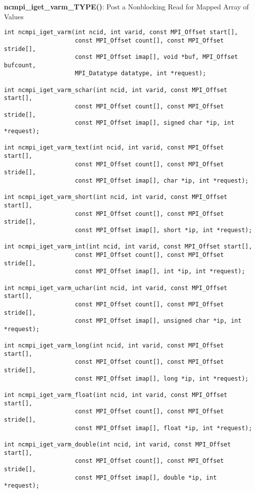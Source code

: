 {\bf ncmpi\_iget\_varm\_TYPE()}: Post a Nonblocking Read for Mapped Array of Values

\begin{verbatim}
int ncmpi_iget_varm(int ncid, int varid, const MPI_Offset start[],
                    const MPI_Offset count[], const MPI_Offset stride[],
                    const MPI_Offset imap[], void *buf, MPI_Offset bufcount,
                    MPI_Datatype datatype, int *request); 

int ncmpi_iget_varm_schar(int ncid, int varid, const MPI_Offset start[],
                    const MPI_Offset count[], const MPI_Offset stride[],
                    const MPI_Offset imap[], signed char *ip, int *request); 

int ncmpi_iget_varm_text(int ncid, int varid, const MPI_Offset start[],
                    const MPI_Offset count[], const MPI_Offset stride[],
                    const MPI_Offset imap[], char *ip, int *request); 

int ncmpi_iget_varm_short(int ncid, int varid, const MPI_Offset start[],
                    const MPI_Offset count[], const MPI_Offset stride[],
                    const MPI_Offset imap[], short *ip, int *request); 

int ncmpi_iget_varm_int(int ncid, int varid, const MPI_Offset start[],
                    const MPI_Offset count[], const MPI_Offset stride[],
                    const MPI_Offset imap[], int *ip, int *request); 

int ncmpi_iget_varm_uchar(int ncid, int varid, const MPI_Offset start[],
                    const MPI_Offset count[], const MPI_Offset stride[],
                    const MPI_Offset imap[], unsigned char *ip, int *request);

int ncmpi_iget_varm_long(int ncid, int varid, const MPI_Offset start[],
                    const MPI_Offset count[], const MPI_Offset stride[],
                    const MPI_Offset imap[], long *ip, int *request);

int ncmpi_iget_varm_float(int ncid, int varid, const MPI_Offset start[],
                    const MPI_Offset count[], const MPI_Offset stride[],
                    const MPI_Offset imap[], float *ip, int *request); 

int ncmpi_iget_varm_double(int ncid, int varid, const MPI_Offset start[],
                    const MPI_Offset count[], const MPI_Offset stride[],
                    const MPI_Offset imap[], double *ip, int *request);
\end{verbatim}
